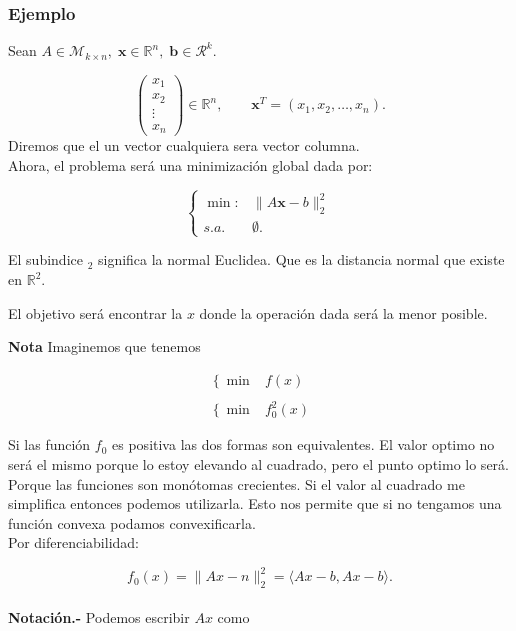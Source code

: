 \subsubsection*{Ejemplo}
Sean $A\in \mathcal{M}_{k\times n},\; \textbf{x}\in \mathbb{R}^n,\; \textbf{b}\in \mathcal{R}^k$.

$$
\begin{pmatrix}
    x_1\\
    x_2\\
    \vdots\\
    x_n
\end{pmatrix}
\in \mathbb{R}^n,
\qquad 
\textbf{x}^T=(x_1,x_2,\ldots,x_n).
$$
Diremos que el un vector cualquiera sera vector columna.\\

Ahora, el problema será una minimización global dada por:

$$
\left\{
\begin{array}{rl}
    \min: &\|A\textbf{x}-b\|^2_2\\
    s.a. & \emptyset.
\end{array}
\right.
$$

El subindice $_2$ significa la normal Euclidea. Que es la distancia normal que existe en $\mathbb{R}^2.$

El objetivo será encontrar la $x$ donde la operación dada será la menor posible.

\textbf{Nota}
Imaginemos que tenemos 

$$
\begin{array}{rl}
    \left\{\min\right. & f(x)\\\\
    \left\{ \min \right. & f_0^2(x)
\end{array}
$$

Si las función $f_0$ es positiva las dos formas son equivalentes. El valor optimo no será el mismo porque lo estoy elevando al cuadrado, pero el punto optimo lo será. Porque las funciones son monótomas crecientes. Si el valor al cuadrado me simplifica entonces podemos utilizarla. Esto nos permite que si no tengamos una función convexa podamos convexificarla.\\


Por diferenciabilidad:

$$f_0(x)=\|Ax-n\|_2^2 = \langle Ax-b,Ax-b\rangle.$$\\


\textbf{Notación.-} Podemos escribir $Ax$ como

